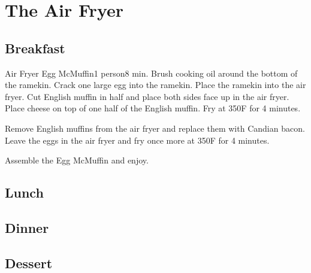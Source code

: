 \chapter{The Air Fryer}
\label{chap:air-fryer}

\section{Breakfast}
\label{sec:air-fryer-breakfast}

\begin{recipe}{Air Fryer Egg McMuffin}{1 person}{8 min.}
Brush cooking oil around the bottom of the ramekin. Crack one large egg
into the ramekin. Place the ramekin into the air fryer. Cut English muffin
in half and place both sides face up in the air fryer. Place cheese on top of
one half of the English muffin.  Fry at 350\0F for 4 minutes.

Remove English muffins from the air fryer and replace them with Candian bacon.
Leave the eggs in the air fryer and fry once more at 350\0F for 4 minutes.

\newstep Assemble the Egg McMuffin and enjoy.
\end{recipe}

\section{Lunch}
\label{sec:air-fryer-lunch}

\clearpage

\section{Dinner}
\label{sec:air-fryer-dinner}

\clearpage

\section{Dessert}
\label{sec:air-fryer-dessert}

\clearpage
